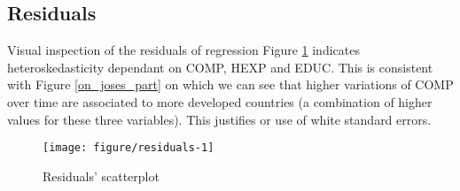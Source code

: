 \documentclass[12pt,a4paper]{article}\usepackage[]{graphicx}\usepackage[]{color}
\makeatletter
\def\maxwidth{ %
  \ifdim\Gin@nat@width>\linewidth
    \linewidth
  \else
    \Gin@nat@width
  \fi
}
\newenvironment{kframe}{%
 \def\at@end@of@kframe{}%
 \ifinner\ifhmode%
  \def\at@end@of@kframe{\end{minipage}}%
  \begin{minipage}{\columnwidth}%
 \fi\fi%
 \def\FrameCommand##1{\hskip\@totalleftmargin \hskip-\fboxsep
 \colorbox{shadecolor}{##1}\hskip-\fboxsep
     \hskip-\linewidth \hskip-\@totalleftmargin \hskip\columnwidth}%
 \MakeFramed {\advance\hsize-\width
   \@totalleftmargin\z@ \linewidth\hsize
   \@setminipage}}%
 {\par\unskip\endMakeFramed%
 \at@end@of@kframe}
\newenvironment{knitrout}{}{} %
\makeatother
\begin{document}
\subsection{Residuals}
Visual inspection of the residuals of regression Figure \ref{fig:residuals} indicates heteroskedasticity dependant on COMP, HEXP and EDUC. This is consistent with Figure \ref{on_joses_part} on which we can see that higher variations of COMP over time are associated to more developed countries (a combination of higher values for these three variables). This justifies or use of white standard errors.
\begin{knitrout}
\color{fgcolor}\begin{kframe}


{\ttfamily\noindent\bfseries\color{errorcolor}{\#\# Error in `[.data.frame`(x, , c(1, 2, 3, 4, 5, 12, 13)): undefined columns selected}}

{\ttfamily\noindent\bfseries\color{errorcolor}{\#\# Error in `[.data.frame`(tmp3, , c(2:11, 14:18)): undefined columns selected}}

{\ttfamily\noindent\bfseries\color{errorcolor}{\#\# Error in eval(expr, envir, enclos): object 'tmp2' not found}}

{\ttfamily\noindent\bfseries\color{errorcolor}{\#\# Error in tmp\$Fitted[which(tmp\$model == "{}RE"{})] <- tmp3\$pred: replacement has length zero}}\end{kframe}\begin{figure}[!htbp]

{\centering \texttt{[image: figure/residuals-1]} 

}

\caption[Residuals' scatterplot]{Residuals' scatterplot}\label{fig:residuals}
\end{figure}


\end{knitrout}

\end{document}
